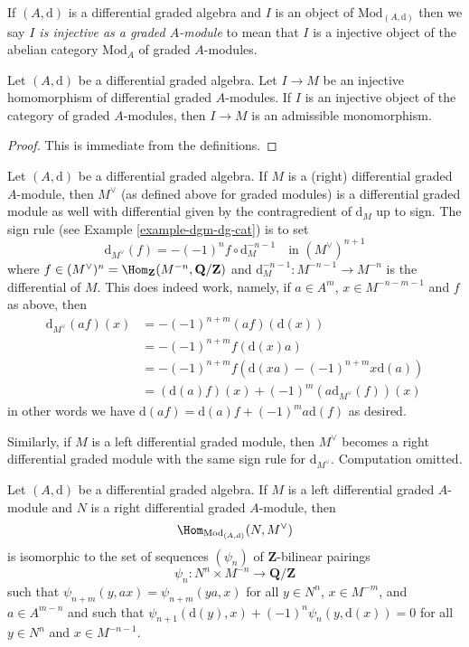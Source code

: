 \medskip\noindent
If $(A, \text{d})$ is a differential graded algebra and $I$ is
an object of $\text{Mod}_{(A, \text{d})}$ then we say
{\it $I$ is injective as a graded $A$-module} to mean
that $I$ is a injective object of the abelian category $\text{Mod}_A$
of graded $A$-modules.

\begin{lemma}
\label{lemma-source-graded-injective}
Let $(A, \text{d})$ be a differential graded algebra.
Let $I \to M$ be an injective homomorphism of differential graded
$A$-modules. If $I$ is an injective object of the category
of graded $A$-modules, then $I \to M$ is an admissible monomorphism.
\end{lemma}

\begin{proof}
This is immediate from the definitions.
\end{proof}

\noindent
Let $(A, \text{d})$ be a differential graded algebra. If $M$ is a
(right) differential graded $A$-module, then $M^\vee$ (as defined above
for graded modules) is a differential graded module as well with
differential given by the contragredient of $\text{d}_M$ up to sign.
The sign rule (see Example \ref{example-dgm-dg-cat}) is to set
$$
\text{d}_{M^\vee}(f) = - (-1)^n f \circ \text{d}_M^{-n - 1}
\quad\text{in }(M^\vee)^{n + 1}
$$
where $f \in (M^\vee)^n = \Hom_\mathbf{Z}(M^{-n}, \mathbf{Q}/\mathbf{Z})$
and $\text{d}_M^{-n - 1} : M^{-n - 1} \to M^{-n}$ is the differential
of $M$. This does indeed work, namely, if $a \in A^m$, $x \in M^{-n - m - 1}$
and $f$ as above, then
\begin{align*}
\text{d}_{M^\vee}(a f)(x) & =
- (-1)^{n + m} (a f)(\text{d}(x)) \\
& =
- (-1)^{n + m} f(\text{d}(x)a) \\
& =
- (-1)^{n + m} f(\text{d}(xa) - (-1)^{n + m}x\text{d}(a)) \\
& =
(\text{d}(a) f)(x) + (-1)^m (a \text{d}_{M^\vee}(f))(x)
\end{align*}
in other words we have $\text{d}(af) = \text{d}(a)f + (-1)^m a \text{d}(f)$
as desired.

\medskip\noindent
Similarly, if $M$ is a left differential graded module, then
$M^\vee$ becomes a right differential graded module with the same
sign rule for $\text{d}_{M^\vee}$. Computation omitted.

\begin{lemma}
\label{lemma-map-into-dual}
Let $(A, \text{d})$ be a differential graded algebra. If
$M$ is a left differential graded $A$-module and $N$ is a
right differential graded $A$-module, then
$$
\Hom_{\text{Mod}_{(A, \text{d})}}(N, M^\vee)
$$
is isomorphic to the set of sequences $(\psi_n)$ of $\mathbf{Z}$-bilinear
pairings
$$
\psi_n : N^n \times M^{-n} \longrightarrow \mathbf{Q}/\mathbf{Z}
$$
such that $\psi_{n + m}(y, ax) = \psi_{n + m}(ya, x)$ for all
$y \in N^n$, $x \in M^{-m}$, and $a \in A^{m - n}$ and such that
$\psi_{n + 1}(\text{d}(y), x) + (-1)^n \psi_n(y, \text{d}(x)) = 0$
for all $y \in N^n$ and $x \in M^{-n - 1}$.
\end{lemma}

